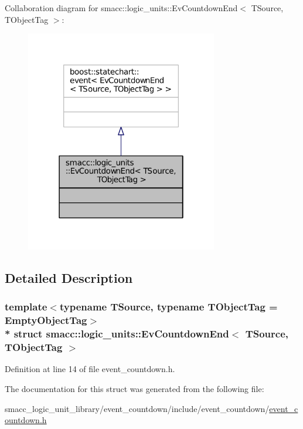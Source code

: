 Collaboration diagram for smacc\+:\+:logic\+\_\+units\+:\+:Ev\+Countdown\+End$<$ T\+Source, T\+Object\+Tag $>$\+:
\nopagebreak
\begin{figure}[H]
\begin{center}
\leavevmode
\includegraphics[width=238pt]{structsmacc_1_1logic__units_1_1EvCountdownEnd__coll__graph}
\end{center}
\end{figure}


\subsection{Detailed Description}
\subsubsection*{template$<$typename T\+Source, typename T\+Object\+Tag = Empty\+Object\+Tag$>$\\*
struct smacc\+::logic\+\_\+units\+::\+Ev\+Countdown\+End$<$ T\+Source, T\+Object\+Tag $>$}



Definition at line 14 of file event\+\_\+countdown.\+h.



The documentation for this struct was generated from the following file\+:\begin{DoxyCompactItemize}
\item 
smacc\+\_\+logic\+\_\+unit\+\_\+library/event\+\_\+countdown/include/event\+\_\+countdown/\hyperlink{event__countdown_8h}{event\+\_\+countdown.\+h}\end{DoxyCompactItemize}
